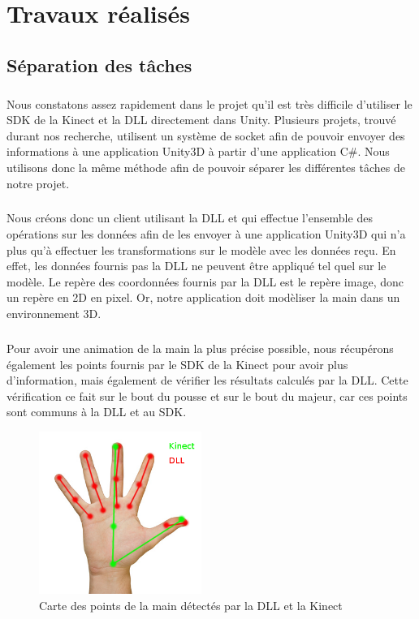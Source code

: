 \chapter{Travaux réalisés}

\section{Séparation des tâches}
\paragraph{}
Nous constatons assez rapidement dans le projet qu'il est très difficile d'utiliser
le SDK de la Kinect et la DLL directement dans Unity. Plusieurs projets, trouvé durant nos recherche, utilisent un système 
de socket afin de pouvoir envoyer des informations à une application Unity3D à partir d'une application C\#.
Nous utilisons donc la même méthode afin de pouvoir séparer les différentes tâches de notre projet.

\paragraph{}
Nous créons donc un client utilisant la DLL et qui effectue l'ensemble des opérations sur les données afin
de les envoyer à une application Unity3D qui n'a plus qu'à effectuer les transformations sur le modèle avec
les données reçu. En effet, les données fournis pas la DLL ne peuvent être appliqué tel quel sur le modèle.
Le repère des coordonnées fournis par la DLL est le repère image, donc un repère en 2D en pixel. Or, notre 
application doit modèliser la main dans un environnement 3D.

\paragraph{}
Pour avoir une animation de la main la plus précise possible, nous récupérons également les points fournis par
le SDK de la Kinect pour avoir plus d'information, mais également de vérifier les résultats calculés par 
la DLL. Cette vérification ce fait sur le bout du pousse et sur le bout du majeur, car ces points sont communs
à la DLL et au SDK.

\begin{figure}[H]
  \label{carte_main}
  \begin{center}
    \includegraphics[width=200px]{images/main2.png}
    \caption{Carte des points de la main détectés par la DLL et la Kinect}
  \end{center}
\end{figure}

